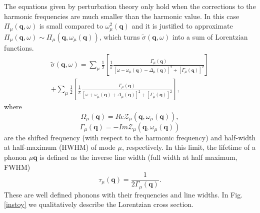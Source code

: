 The equations given by perturbation theory only hold when the corrections to the harmonic frequencies are much smaller than the harmonic value. In this case $\Pi_{\mu}(\mathbf{q},\omega)$ is small compared to $\omega_{\mu}^{2}(\mathbf{q})$ and it is justified to approximate 
$\Pi_{\mu}(\mathbf{q},\omega)\sim\Pi_{\mu}(\mathbf{q},\omega_{\mu}(\mathbf{q}))$, which turns $\tilde{\sigma}(\mathbf{q},\omega)$ into a sum of Lorentzian functions. 
\begin{multline}
 \tilde{\sigma}(\mathbf{q},\omega)=\sum_{\mu}\frac{1}{2}\left[\frac{1}{\pi}\frac{\Gamma_{\mu}(\mathbf{q})}{[\omega-\omega_{\mu}(\mathbf{q})-\Delta_{\mu}(\mathbf{q})]^{2}+[\Gamma_{\mu}(\mathbf{q})]^{2}}\right]\\+\sum_{
 \mu}\frac{1}{2}\left[\frac{1}{\pi}\frac{\Gamma_{\mu}(\mathbf{q})}{[\omega+\omega_{\mu}(\mathbf{q})+\Delta_{\mu}(\mathbf{q})]^{2}+[\Gamma_{\mu}(\mathbf{q})]^{2}}\right],
\end{multline}
where
\begin{equation}
 \label{lineshift}
 \Omega_{\mu}(\mathbf{q})=Re\mathcal{Z}_{\mu}(\mathbf{q},\omega_{\mu}(\mathbf{q})),
\end{equation}
\begin{equation}
 \label{linewidth}
 \Gamma_{\mu}(\mathbf{q})=-Im\mathcal{Z}_{\mu}(\mathbf{q},\omega_{\mu}(\mathbf{q}))
\end{equation}
are the shifted frequency (with respect to the harmonic frequency) and half-width at half-maximum (HWHM) of mode 
$\mu$, respectively. In this limit, the lifetime of a phonon $\mu\mathbf{q}$ is defined as the inverse line width 
(full width at half maximum, FWHM)
\begin{equation}
\label{lifetime}
 \tau_{\mu}(\mathbf{q})=\frac{1}{2\Gamma_{\mu}(\mathbf{q})}.
\end{equation}
These are well defined phonons with their frequencies and line widths. 
In Fig. \ref{instoy} we qualitatively describe the Lorentzian cross section.
